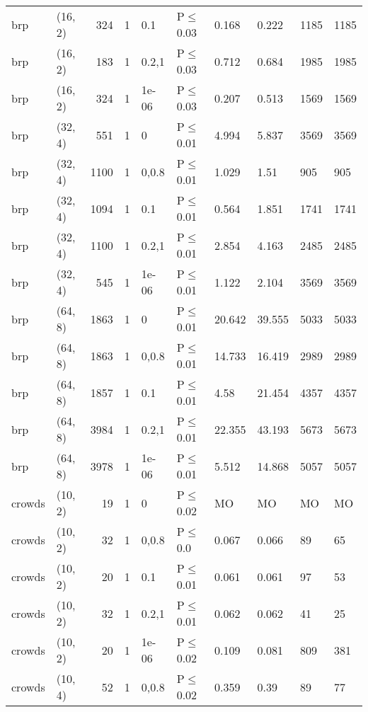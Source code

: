 \begin{longtable}{llrrllllll}
 brp           & (16, 2)  &    	324 & 1 & 0.1   & P$\leq$0.03  & 0.168   & 0.222   & 1185    & 1185 \\
 brp           & (16, 2)  &    	183 & 1 & 0.2,1 & P$\leq$0.03  & 0.712   & 0.684   & 1985    & 1985 \\
 brp           & (16, 2)  &    	324 & 1 & 1e-06 & P$\leq$0.03  & 0.207   & 0.513   & 1569    & 1569 \\
 brp           & (32, 4)  &    	551 & 1 & 0     & P$\leq$0.01  & 4.994   & 5.837   & 3569    & 3569 \\
 brp           & (32, 4)  &   	1100 & 1 & 0,0.8 & P$\leq$0.01  & 1.029   & 1.51    & 905     & 905  \\
 brp           & (32, 4)  &   	1094 & 1 & 0.1   & P$\leq$0.01  & 0.564   & 1.851   & 1741    & 1741 \\
 brp           & (32, 4)  &   	1100 & 1 & 0.2,1 & P$\leq$0.01  & 2.854   & 4.163   & 2485    & 2485 \\
 brp           & (32, 4)  &    	545 & 1 & 1e-06 & P$\leq$0.01  & 1.122   & 2.104   & 3569    & 3569 \\
 brp           & (64, 8)  &   	1863 & 1 & 0     & P$\leq$0.01  & 20.642  & 39.555  & 5033    & 5033 \\
 brp           & (64, 8)  &   	1863 & 1 & 0,0.8 & P$\leq$0.01  & 14.733  & 16.419  & 2989    & 2989 \\
 brp           & (64, 8)  &   	1857 & 1 & 0.1   & P$\leq$0.01  & 4.58    & 21.454  & 4357    & 4357 \\
 brp           & (64, 8)  &   	3984 & 1 & 0.2,1 & P$\leq$0.01  & 22.355  & 43.193  & 5673    & 5673 \\
 brp           & (64, 8)  &   	3978 & 1 & 1e-06 & P$\leq$0.01  & 5.512   & 14.868  & 5057    & 5057 \\
 crowds        & (10, 2)  &     	19 & 1 & 0     & P$\leq$0.02  & MO      & MO      & MO      & MO   \\
 crowds        & (10, 2)  &     	32 & 1 & 0,0.8 & P$\leq$0.0   & 0.067   & 0.066   & 89      & 65   \\
 crowds        & (10, 2)  &     	20 & 1 & 0.1   & P$\leq$0.01  & 0.061   & 0.061   & 97      & 53   \\
 crowds        & (10, 2)  &     	32 & 1 & 0.2,1 & P$\leq$0.01  & 0.062   & 0.062   & 41      & 25   \\
 crowds        & (10, 2)  &     	20 & 1 & 1e-06 & P$\leq$0.02  & 0.109   & 0.081   & 809     & 381  \\
 crowds        & (10, 4)  &     	52 & 1 & 0,0.8 & P$\leq$0.02  & 0.359   & 0.39    & 89      & 77   \\

\end{longtable}
